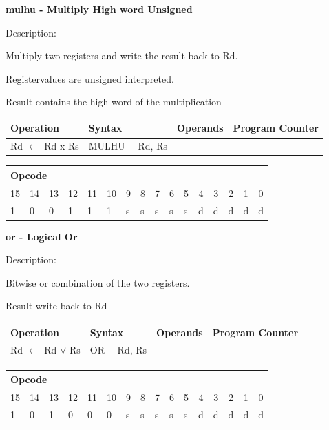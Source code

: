 \documentclass[%
	pdftex,
	a4paper,
	oneside,
	bibtotoc,%
	idxtotoc,%
	bibtotocnumbered,
	halfparskip,%
]{scrbook}
\begin{document}
\bigskip

\textbf{mulhu - Multiply High word Unsigned}

Description:

Multiply two registers and write the result back to Rd.

Registervalues are unsigned interpreted.

Result contains the high-word of the multiplication

\begin{tabular}{|l|l|l|l|}
\hline
Operation & Syntax & Operands & Program Counter \\ \hline
Rd $\leftarrow $ Rd x Rs & MULHU \ \ Rd, Rs &  &  \\ \hline
\end{tabular}

\begin{tabular}{|c|c|c|c|c|c|c|c|c|c|c|c|c|c|c|c|}
\hline
\multicolumn{6}{|l|}{Opcode} & \multicolumn{5}{|l|}{} & \multicolumn{5}{|l|}{
} \\ \hline
15 & 14 & 13 & 12 & 11 & 10 & 9 & 8 & 7 & 6 & 5 & 4 & 3 & 2 & 1 & 0 \\ \hline
\multicolumn{1}{|l|}{1} & \multicolumn{1}{|l|}{0} & \multicolumn{1}{|l|}{0}
& \multicolumn{1}{|l|}{1} & \multicolumn{1}{|l|}{1} & \multicolumn{1}{|l|}{1}
& \multicolumn{1}{|l|}{s} & \multicolumn{1}{|l|}{s} & \multicolumn{1}{|l|}{s}
& \multicolumn{1}{|l|}{s} & \multicolumn{1}{|l|}{s} & \multicolumn{1}{|l|}{d}
& \multicolumn{1}{|l|}{d} & \multicolumn{1}{|l|}{d} & \multicolumn{1}{|l|}{d}
& \multicolumn{1}{|l|}{d} \\ \hline
\end{tabular}

\bigskip

\textbf{or - Logical Or}

Description:

Bitwise or combination of the two registers.

Result write back to Rd

\begin{tabular}{|l|l|l|l|}
\hline
Operation & Syntax & Operands & Program Counter \\ \hline
Rd $\leftarrow $ Rd $\vee $ Rs & OR \ \ Rd, Rs &  &  \\ \hline
\end{tabular}

\begin{tabular}{|c|c|c|c|c|c|c|c|c|c|c|c|c|c|c|c|}
\hline
\multicolumn{6}{|l|}{Opcode} & \multicolumn{5}{|l|}{} & \multicolumn{5}{|l|}{
} \\ \hline
15 & 14 & 13 & 12 & 11 & 10 & 9 & 8 & 7 & 6 & 5 & 4 & 3 & 2 & 1 & 0 \\ \hline
\multicolumn{1}{|l|}{1} & \multicolumn{1}{|l|}{0} & \multicolumn{1}{|l|}{1}
& \multicolumn{1}{|l|}{0} & \multicolumn{1}{|l|}{0} & \multicolumn{1}{|l|}{0}
& \multicolumn{1}{|l|}{s} & \multicolumn{1}{|l|}{s} & \multicolumn{1}{|l|}{s}
& \multicolumn{1}{|l|}{s} & \multicolumn{1}{|l|}{s} & \multicolumn{1}{|l|}{d}
& \multicolumn{1}{|l|}{d} & \multicolumn{1}{|l|}{d} & \multicolumn{1}{|l|}{d}
& \multicolumn{1}{|l|}{d} \\ \hline
\end{tabular}
\end{document}
